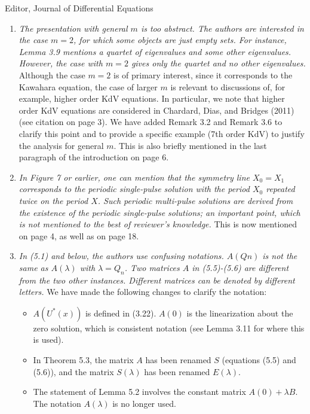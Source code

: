\documentclass[11pt]{letter}
\begin{document}
\begin{letter}{Editor, Journal of Differential Equations}
\begin{enumerate}
    \item \emph{The presentation with general $m$ is too abstract. The authors are interested in the case $m = 2$, for which some objects are just empty sets. For instance, Lemma 3.9 mentions a quartet of eigenvalues and some other eigenvalues. However, the case with $m = 2$ gives only the quartet and no other eigenvalues.} Although the case $m=2$ is of primary interest, since it corresponds to the Kawahara equation, the case of larger $m$ is relevant to discussions of, for example, higher order KdV equations. In particular, we note that higher order KdV equations are considered in Chardard, Dias, and Bridges (2011) (see citation on page 3). We have added Remark 3.2 and Remark 3.6 to clarify this point and to provide a specific example (7th order KdV) to justify the analysis for general $m$. This is also briefly mentioned in the last paragraph of the introduction on page 6.
    \vspace{4mm}

    \item \emph{In Figure 7 or earlier, one can mention that the symmetry line $X_0 = X_1$ corresponds to the periodic single-pulse solution with the period $X_0$ repeated twice on the period $X$. Such periodic multi-pulse solutions are derived from the existence of the periodic single-pulse solutions; an important point, which is not mentioned to the best of reviewer's knowledge.} This is now mentioned on page 4, as well as on page 18.
    \vspace{4mm}

    \item \emph{In (5.1) and below, the authors use confusing notations. $A(Qn)$ is not the same as $A(\lambda)$ with $\lambda = Q_n$. Two matrices $A$ in (5.5)-(5.6) are different from the two other instances. Different matrices can be denoted by different letters.} We have made the following changes to clarify the notation:
    \begin{itemize}
        \item $A(U^*(x))$ is defined in (3.22). $A(0)$ is the linearization about the zero solution, which is consistent notation (see Lemma 3.11 for where this is used).
        \item In Theorem 5.3, the matrix $A$ has been renamed $S$ (equations (5.5) and (5.6)), and the matrix $S(\lambda)$ has been renamed $E(\lambda)$.
        \item The statement of Lemma 5.2 involves the constant matrix $A(0)+\lambda B$. The notation $A(\lambda)$ is no longer used.
    \end{itemize}
    \vspace{4mm}


\end{enumerate}
\end{letter}
\end{document}
